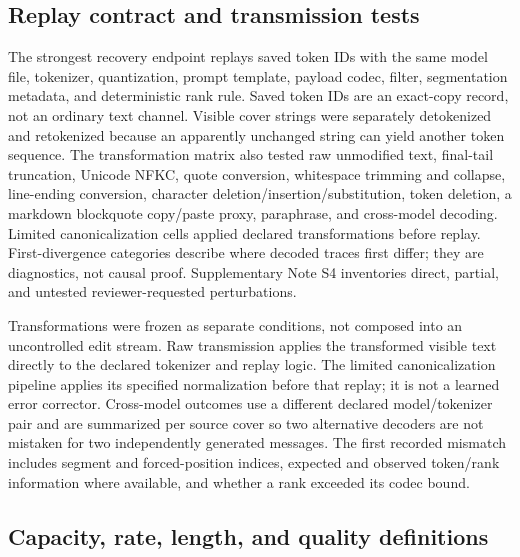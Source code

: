 \documentclass[fleqn,10pt]{wlscirep}
\begin{document}
\subsection*{Replay contract and transmission tests}\label{sec:replay-method}

The strongest recovery endpoint replays saved token IDs with the same model file, tokenizer, quantization, prompt template, payload codec, filter, segmentation metadata, and deterministic rank rule. Saved token IDs are an exact-copy record, not an ordinary text channel. Visible cover strings were separately detokenized and retokenized because an apparently unchanged string can yield another token sequence. The transformation matrix also tested raw unmodified text, final-tail truncation, Unicode NFKC, quote conversion, whitespace trimming and collapse, line-ending conversion, character deletion/insertion/substitution, token deletion, a markdown blockquote copy/paste proxy, paraphrase, and cross-model decoding. Limited canonicalization cells applied declared transformations before replay. First-divergence categories describe where decoded traces first differ; they are diagnostics, not causal proof. Supplementary Note S4 inventories direct, partial, and untested reviewer-requested perturbations.

Transformations were frozen as separate conditions, not composed into an uncontrolled edit stream. Raw transmission applies the transformed visible text directly to the declared tokenizer and replay logic. The limited canonicalization pipeline applies its specified normalization before that replay; it is not a learned error corrector. Cross-model outcomes use a different declared model/tokenizer pair and are summarized per source cover so two alternative decoders are not mistaken for two independently generated messages. The first recorded mismatch includes segment and forced-position indices, expected and observed token/rank information where available, and whether a rank exceeded its codec bound.

\subsection*{Capacity, rate, length, and quality definitions}\label{sec:capacity-method}
\end{document}
